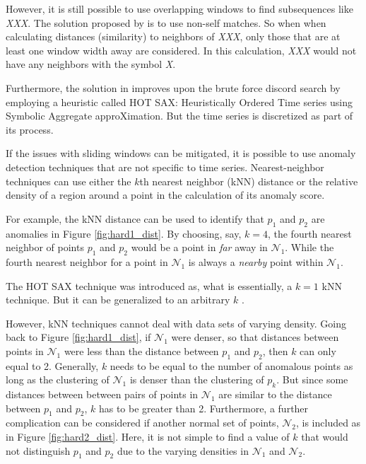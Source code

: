 However, it is still possible to use overlapping windows to find subsequences like \emph{XXX}. The solution proposed by  \cite{Keogh2005} is to use non-self matches. So when when calculating distances (similarity) to neighbors of \emph{XXX}, only those that are at least one window width away are considered. In this calculation, \emph{XXX} would not have any neighbors with the symbol \emph{X}.

Furthermore, the solution in \cite{Keogh2005} improves upon the brute force discord search by employing a heuristic called HOT SAX: Heuristically Ordered Time series using Symbolic Aggregate approXimation. But the time series is discretized as part of its process.

If the issues with sliding windows can be mitigated, it is possible to use anomaly detection techniques that are not specific to time series. Nearest-neighbor techniques can use either the $k$th nearest neighbor (kNN) distance or the relative density of a region around a point in the calculation of its anomaly score.

For example, the kNN distance can be used to identify that $p_1$ and $p_2$ are anomalies in Figure \ref{fig:hard1_dist}. By choosing, say, $k=4$, the fourth nearest neighbor of points $p_1$ and $p_2$ would be a point in \emph{far} away in $\mathcal{N}_1$. While the fourth nearest neighbor for a point in $\mathcal{N}_1$ is always a \emph{nearby} point within $\mathcal{N}_1$. 

The HOT SAX technique was introduced as, what is essentially, a $k=1$ kNN technique. But it can be generalized to an arbitrary $k$ \cite{Keogh2007,Yankov2008}.

However, kNN techniques cannot deal with data sets of varying density. Going back to Figure \ref{fig:hard1_dist}, if $\mathcal{N}_1$ were denser, so that distances between points in $\mathcal{N}_1$ were less than the distance between $p_1$ and $p_2$, then $k$ can only equal to 2. Generally, $k$ needs to be equal to the number of anomalous points as long as the clustering of $\mathcal{N}_1$ is denser than the clustering of $p_k$. But since some distances between between pairs of points in $\mathcal{N}_1$ are similar to the distance between $p_1$ and $p_2$, $k$ has to be greater than 2. Furthermore, a further complication can be considered if another normal set of points, $\mathcal{N}_2$, is included as in Figure \ref{fig:hard2_dist}. Here, it is not simple to find a value of $k$ that would not distinguish $p_1$ and $p_2$ due to the varying densities in $\mathcal{N}_1$ and $\mathcal{N}_2$.


